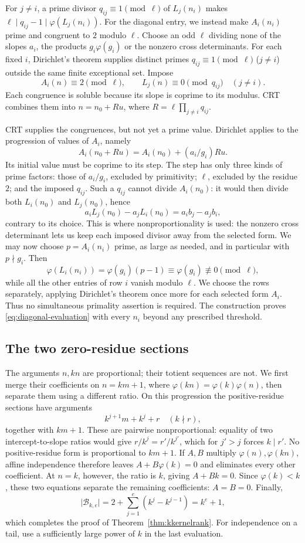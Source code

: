 \documentclass[11pt]{article}
\begin{document}
For $j\ne i$, a prime divisor $q_{ij}\equiv1\pmod\ell$ of
$L_j(n_i)$ makes $\ell\mid q_{ij}-1\mid\varphi(L_j(n_i))$.
For the diagonal entry, we instead make $A_i(n_i)$ prime and
congruent to $2$ modulo $\ell$.
Choose an odd $\ell$ dividing none of the slopes $a_i$, the products
$g_i\varphi(g_i)$ or the nonzero cross determinants. For each fixed
$i$, Dirichlet's theorem supplies distinct primes
$q_{ij}\equiv1\pmod\ell$ ($j\ne i$) outside the same finite exceptional
set. Impose
\[
 A_i(n)\equiv2\pmod\ell,\qquad
 L_j(n)\equiv0\pmod{q_{ij}}\quad(j\ne i).
\]
Each congruence is soluble because its slope is coprime to its
modulus. CRT combines them into $n=n_0+Ru$, where
$R=\ell\prod_{j\ne i}q_{ij}$.

CRT supplies the congruences, but not yet a prime value. Dirichlet
applies to the progression of values of $A_i$, namely
\[
 A_i(n_0+Ru)=A_i(n_0)+(a_i/g_i)Ru.
\]
Its initial value must be coprime to its step. The step has only
three kinds of prime factors: those of $a_i/g_i$, excluded by
primitivity; $\ell$, excluded by the residue $2$; and the imposed
$q_{ij}$. Such a $q_{ij}$ cannot divide
$A_i(n_0)$: it would then divide both $L_i(n_0)$ and $L_j(n_0)$, hence
\[
 a_iL_j(n_0)-a_jL_i(n_0)=a_i b_j-a_j b_i,
\]
contrary to its choice. This is where nonproportionality is used:
the nonzero cross determinant lets us keep each imposed divisor
away from the selected form. We may now choose $p=A_i(n_i)$ prime,
as large as needed,
and in particular with $p\nmid g_i$. Then
\[
 \varphi(L_i(n_i))=\varphi(g_i)(p-1)
       \equiv\varphi(g_i)\not\equiv0\pmod\ell,
\]
while all the other entries of row $i$ vanish modulo $\ell$.
We choose the rows separately, applying Dirichlet's theorem once
more for each selected form $A_i$. Thus no simultaneous primality
assertion is required. The construction proves
\eqref{eq:diagonal-evaluation} with every $n_i$ beyond any prescribed
threshold.

\subsection*{The two zero-residue sections}
The arguments $n,kn$ are proportional; their totient sequences are
not. We first merge their coefficients on
$n=km+1$, where $\varphi(kn)=\varphi(k)\varphi(n)$, then separate
them using a different ratio. On this progression the
positive-residue sections have arguments
\[
 k^{j+1}m+k^j+r\quad(k\nmid r),
\]
together with $km+1$. These are pairwise nonproportional: equality of
two intercept-to-slope ratios would give
$r/k^j=r'/k^{j'}$, which for $j'>j$ forces $k\mid r'$.
No positive-residue form is proportional to $km+1$.
If $A,B$ multiply $\varphi(n),\varphi(kn)$, affine independence
therefore leaves $A+B\varphi(k)=0$ and eliminates every other
coefficient. At $n=k$, however, the ratio is $k$, giving $A+Bk=0$.
Since $\varphi(k)<k$, these two equations separate the remaining
coefficients: $A=B=0$. Finally,
\[
 \lvert\mathcal B_{k,e}\rvert
   =2+\sum_{j=1}^e(k^j-k^{j-1})=k^e+1,
\]
which completes the proof of Theorem~\ref{thm:kkernelrank}.
For independence on a tail, use a sufficiently large power of $k$
in the last evaluation.
\end{document}
